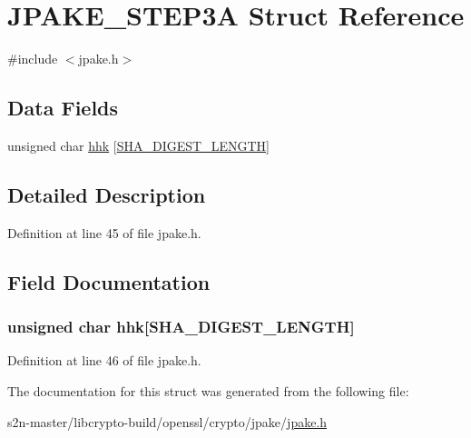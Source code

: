 \hypertarget{struct_j_p_a_k_e___s_t_e_p3_a}{}\section{J\+P\+A\+K\+E\+\_\+\+S\+T\+E\+P3A Struct Reference}
\label{struct_j_p_a_k_e___s_t_e_p3_a}


{\ttfamily \#include $<$jpake.\+h$>$}

\subsection*{Data Fields}
\begin{DoxyCompactItemize}
\item 
unsigned char \hyperlink{struct_j_p_a_k_e___s_t_e_p3_a_ab0f66a8cdb6bae271c07420657c54992}{hhk} \mbox{[}\hyperlink{include_2openssl_2sha_8h_a1a715db7b4403fe6c165e49a32f5fe3d}{S\+H\+A\+\_\+\+D\+I\+G\+E\+S\+T\+\_\+\+L\+E\+N\+G\+TH}\mbox{]}
\end{DoxyCompactItemize}


\subsection{Detailed Description}


Definition at line 45 of file jpake.\+h.



\subsection{Field Documentation}
\subsubsection[{\texorpdfstring{hhk}{hhk}}]{\setlength{\rightskip}{0pt plus 5cm}unsigned char hhk\mbox{[}{\bf S\+H\+A\+\_\+\+D\+I\+G\+E\+S\+T\+\_\+\+L\+E\+N\+G\+TH}\mbox{]}}\hypertarget{struct_j_p_a_k_e___s_t_e_p3_a_ab0f66a8cdb6bae271c07420657c54992}{}\label{struct_j_p_a_k_e___s_t_e_p3_a_ab0f66a8cdb6bae271c07420657c54992}


Definition at line 46 of file jpake.\+h.



The documentation for this struct was generated from the following file\+:\begin{DoxyCompactItemize}
\item 
s2n-\/master/libcrypto-\/build/openssl/crypto/jpake/\hyperlink{jpake_8h}{jpake.\+h}\end{DoxyCompactItemize}
